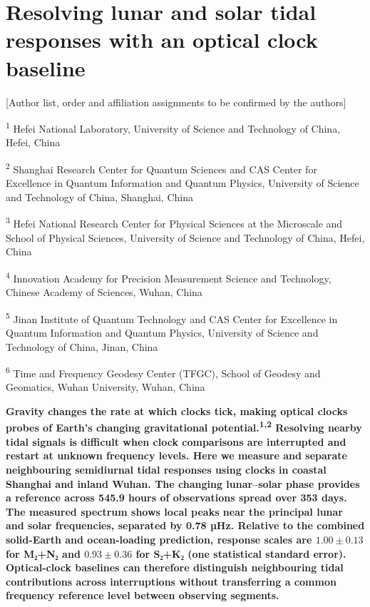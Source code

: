 \documentclass[
  12pt,
  a4paper,
]{article}
\author{}
\date{}
\begin{document}
\hypertarget{resolving-lunar-and-solar-tidal-responses-with-an-optical-clock-baseline}{%
\section{Resolving lunar and solar tidal responses with an optical clock
baseline}\label{resolving-lunar-and-solar-tidal-responses-with-an-optical-clock-baseline}}

\begingroup\singlespacing

{[}Author list, order and affiliation assignments to be confirmed by the
authors{]}

\textsuperscript{1} Hefei National Laboratory, University of Science and
Technology of China, Hefei, China

\textsuperscript{2} Shanghai Research Center for Quantum Sciences and
CAS Center for Excellence in Quantum Information and Quantum Physics,
University of Science and Technology of China, Shanghai, China

\textsuperscript{3} Hefei National Research Center for Physical Sciences
at the Microscale and School of Physical Sciences, University of Science
and Technology of China, Hefei, China

\textsuperscript{4} Innovation Academy for Precision Measurement Science
and Technology, Chinese Academy of Sciences, Wuhan, China

\textsuperscript{5} Jinan Institute of Quantum Technology and CAS Center
for Excellence in Quantum Information and Quantum Physics, University of
Science and Technology of China, Jinan, China

\textsuperscript{6} Time and Frequency Geodesy Center (TFGC), School of
Geodesy and Geomatics, Wuhan University, Wuhan, China

\endgroup

\textbf{Gravity changes the rate at which clocks tick, making optical
clocks probes of Earth's changing gravitational
potential.\textsuperscript{1,2} Resolving nearby tidal signals is
difficult when clock comparisons are interrupted and restart at unknown
frequency levels. Here we measure and separate neighbouring semidiurnal
tidal responses using clocks in coastal Shanghai and inland Wuhan. The
changing lunar--solar phase provides a reference across 545.9 hours of
observations spread over 353 days. The measured spectrum shows local
peaks near the principal lunar and solar frequencies, separated by 0.78
µHz. Relative to the combined solid-Earth and ocean-loading prediction,
response scales are \(1.00\pm0.13\) for M₂+N₂ and \(0.93\pm0.36\) for
S₂+K₂ (one statistical standard error). Optical-clock baselines can
therefore distinguish neighbouring tidal contributions across
interruptions without transferring a common frequency reference level
between observing segments.}
\end{document}
